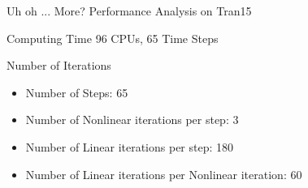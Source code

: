 \documentclass[8pt,xcolor=dvipnames]{beamer}
\begin{document}
\begin{frame}{Uh oh ... More? Performance Analysis on Tran15}

\begin{block}{Computing Time}
96 CPUs, 65 Time Steps
\begin{table}
\begin{center}
\end{center}
\end{table}
\end{block}

\begin{block}{Number of Iterations}
\begin{itemize}
\item Number of Steps: 65
\item Number of Nonlinear iterations per step: 3
\item Number of Linear iterations per step: 180
\item Number of Linear iterations per Nonlinear iteration: 60
\end{itemize}
\end{block}


\end{frame}
\end{document}
